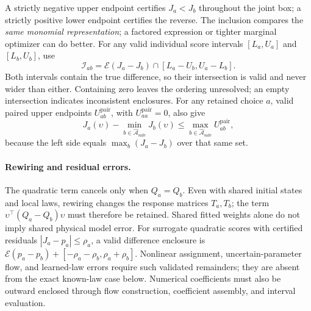 A strictly negative upper endpoint certifies $J_a<J_b$ throughout the joint
box; a strictly positive lower endpoint certifies the reverse.
The inclusion compares the \emph{same monomial representation}; a factored
expression or tighter marginal optimizer can do better. For any valid
individual score intervals $[L_a,U_a]$ and $[L_b,U_b]$, use
\begin{equation}
 \mathcal I_{ab}=
 \mathcal E(J_a-J_b)\cap[L_a-U_b,U_a-L_b].
 \label{eq:paired-hybrid}
\end{equation}
Both intervals contain the true difference, so their intersection is valid
and never wider than either. Containing zero leaves the ordering unresolved;
an empty intersection indicates inconsistent enclosures. For any retained
choice $a$, valid paired upper endpoints $U_{ab}^{\mathrm{pair}}$, with
$U_{aa}^{\mathrm{pair}}=0$, also give
\begin{equation}
 J_a(\upsilon)-\min_{b\in\widehat{\mathcal A}_{\mathrm{safe}}}J_b(\upsilon)
 \le\max_{b\in\widehat{\mathcal A}_{\mathrm{safe}}}U_{ab}^{\mathrm{pair}},
 \label{eq:paired-retained-regret}
\end{equation}
because the left side equals $\max_b(J_a-J_b)$ over that same set.

\paragraph{Rewiring and residual errors.}
The quadratic term cancels only when $Q_a=Q_b$. Even with shared initial
states and local laws, rewiring changes the response matrices $T_a,T_b$;
the term $\upsilon^\top(Q_a-Q_b)\upsilon$ must therefore be retained.
Shared fitted weights alone do not imply shared physical model error.
For surrogate quadratic scores with certified residuals
$|J_a-p_a|\le\rho_a$, a valid difference enclosure is
$\mathcal E(p_a-p_b)+[-\rho_a-\rho_b,\rho_a+\rho_b]$.
Nonlinear assignment, uncertain-parameter flow, and learned-law errors
require such validated remainders; they are absent from the exact known-law
case below. Numerical coefficients must also be outward enclosed through
flow construction, coefficient assembly, and interval evaluation.


